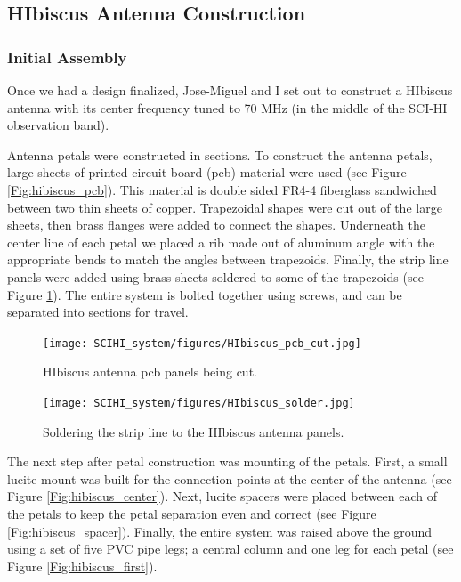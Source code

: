 \subsection{HIbiscus Antenna Construction}

\subsubsection{Initial Assembly}

Once we had a design finalized, Jose-Miguel and I set out to construct a HIbiscus antenna with its center frequency tuned to 70 MHz (in the middle of the SCI-HI observation band).

Antenna petals were constructed in sections. To construct the antenna petals, large sheets of printed circuit board (pcb) material were used (see Figure \ref{Fig:hibiscus_pcb}). This material is double sided FR4-4 fiberglass sandwiched between two thin sheets of copper. Trapezoidal shapes were cut out of the large sheets, then brass flanges were added to connect the shapes. Underneath the center line of each petal we placed a rib made out of aluminum angle with the appropriate bends to match the angles between trapezoids. Finally, the strip line panels were added using brass sheets soldered to some of the trapezoids (see Figure \ref{Fig:hibiscus_solder}). The entire system is bolted together using screws, and can be separated into sections for travel. 

\begin{figure}[htb]
\centering
\begin{minipage}[b]{0.39\textwidth}
\centering
\texttt{[image: SCIHI\_system/figures/HIbiscus\_pcb\_cut.jpg]}
\caption{HIbiscus antenna pcb panels being cut. }
\label{Fig:hibiscus_pcb}
\end{minipage}%
\begin{minipage}[b]{0.02\textwidth}
\hspace{1cm}
\end{minipage}%
\begin{minipage}[b]{0.55\textwidth}
\centering
\texttt{[image: SCIHI\_system/figures/HIbiscus\_solder.jpg]}
\caption{Soldering the strip line to the HIbiscus antenna panels.}
\label{Fig:hibiscus_solder}
\end{minipage}
\end{figure} 

The next step after petal construction was mounting of the petals. First, a small lucite mount was built for the connection points at the center of the antenna (see Figure \ref{Fig:hibiscus_center}). Next, lucite spacers were placed between each of the petals to keep the petal separation even and correct (see Figure \ref{Fig:hibiscus_spacer}). Finally, the entire system was raised above the ground using a set of five PVC pipe legs; a central column and one leg for each petal (see Figure \ref{Fig:hibiscus_first}). 

